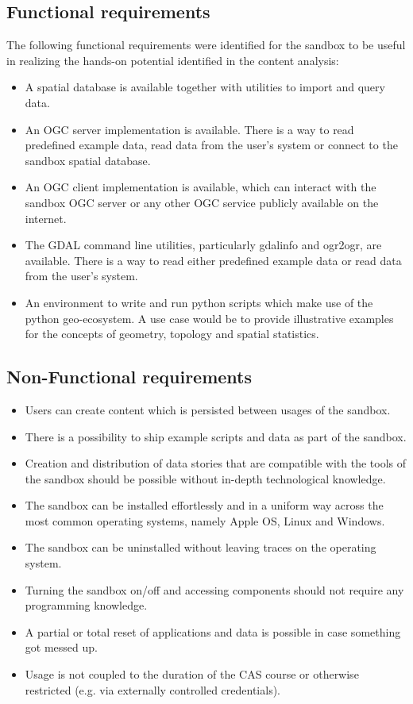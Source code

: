 \documentclass[11pt, a4paper, oneside, parskip=full-]{scrartcl}
\begin{document}
\subsection{Functional requirements}
The following functional requirements were identified for the sandbox to be
useful in realizing the hands-on potential identified in the content analysis:
\begin{itemize}
  \item A spatial database is available together with utilities to import and
  query data.
  \item An OGC server implementation is available. There is a way to read
  predefined example data, read data from the user's system or connect to the
  sandbox spatial database.
  \item An OGC client implementation is available, which can interact with the
  sandbox OGC server or any other OGC service publicly available on the
  internet.
  \item The GDAL command line utilities, particularly gdalinfo and ogr2ogr, are
  available. There is a way to read either predefined example data or read data
  from the user's system.
  \item An environment to write and run python scripts which make use of the
  python geo-ecosystem. A use case would be to provide illustrative examples for
  the concepts of geometry, topology and spatial statistics.
\end{itemize}

\subsection{Non-Functional requirements}
\begin{itemize}
  \item Users can create content which is persisted between usages of the
  sandbox.
  \item There is a possibility to ship example scripts and data as part of the
  sandbox.
  \item Creation and distribution of data stories that are compatible with the
  tools of the sandbox should be possible without in-depth technological
  knowledge.
  \item The sandbox can be installed effortlessly and in a uniform way across
  the most common operating systems, namely Apple OS, Linux and Windows.
  \item The sandbox can be uninstalled without leaving traces on the operating
  system.
  \item Turning the sandbox on/off and accessing components should not require
  any programming knowledge.
  \item A partial or total reset of applications and data is possible in case
  something got messed up.
  \item Usage is not coupled to the duration of the CAS course or otherwise
  restricted (e.g. via externally controlled credentials).
\end{itemize}
\end{document}
